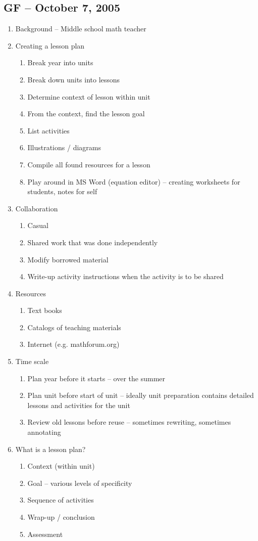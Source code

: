 \subsection{GF -- October 7, 2005}
\begin{enumerate}
	\item Background -- Middle school math teacher
	\item Creating a lesson plan
		\begin{enumerate}
			\item Break year into units
			\item Break down units into lessons
			\item Determine context of lesson within unit
			\item From the context, find the lesson goal
			\item List activities
			\item Illustrations / diagrams
			\item Compile all found resources for a lesson
			\item Play around in MS Word (equation editor) -- creating
				worksheets for students, notes for self
		\end{enumerate}
	\item Collaboration
		\begin{enumerate}
			\item Casual
			\item Shared work that was done independently
			\item Modify borrowed material
			\item Write-up activity instructions when the activity is to be
				shared
		\end{enumerate}
	\item Resources
		\begin{enumerate}
			\item Text books
			\item Catalogs of teaching materials
			\item Internet (e.g. mathforum.org)
		\end{enumerate}
	\item Time scale
		\begin{enumerate}
			\item Plan year before it starts -- over the summer
			\item Plan unit before start of unit -- ideally unit preparation
				contains detailed lessons and activities for the unit
			\item Review old lessons before reuse -- sometimes rewriting,
				sometimes annotating
		\end{enumerate}
	\item What is a lesson plan?
		\begin{enumerate}
			\item Context (within unit)
			\item Goal -- various levels of specificity
			\item Sequence of activities
			\item Wrap-up / conclusion
			\item Assessment
		\end{enumerate}
\end{enumerate}

